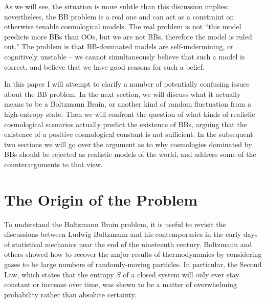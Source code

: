 \documentclass[12pt,letterpaper]{article}
\begin{document}
As we will see, the situation is more subtle than this discussion implies; nevertheless, the BB problem is a real one and can act as a constraint on otherwise tenable cosmological models.
The real problem is not ``this model predicts more BBs than OOs, but we are not BBs, therefore the model is ruled out."
The problem is that BB-dominated models are self-undermining, or cognitively unstable -- we cannot simultaneously believe that such a model is correct, and believe that we have good reasons for such a belief.

In this paper I will attempt to clarify a number of potentially confusing issues about the BB problem.
In the next section, we will discuss what it actually means to be a Boltzmann Brain, or another kind of random fluctuation from a high-entropy state.
Then we will confront the question of what kinds of realistic cosmological scenarios actually predict the existence of BBs, arguing that the existence of a positive cosmological constant is not sufficient.
In the subsequent two sections we will go over the argument as to why cosmologies dominated by BBs should be rejected as realistic models of the world, and address some of the counterarguments to that view.

\section{The Origin of the Problem}

To understand the Boltzmann Brain problem, it is useful to revisit the discussions between Ludwig Boltzmann and his contemporaries in the early days of statistical mechanics near the end of the nineteenth century.
Boltzmann and others showed how to recover the major results of thermodynamics by considering gases to be large numbers of randomly-moving particles.
In particular, the Second Law, which states that the entropy $S$ of a closed system will only ever stay constant or increase over time, was shown to be a matter of overwhelming probability rather than absolute certainty.
\end{document}
